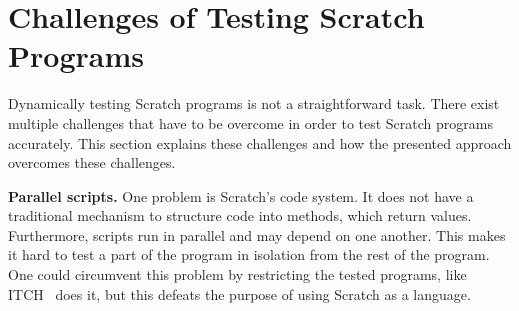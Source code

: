 %
%
%

\section{Challenges of Testing Scratch Programs}


Dynamically testing Scratch programs is not a straightforward task.
There exist multiple challenges that have to be overcome in order to test Scratch programs accurately.
This section explains these challenges and how the presented approach overcomes these challenges.

\textbf{Parallel scripts.}
One problem is Scratch's code system.
It does not have a traditional mechanism to structure code into methods, which return values.
Furthermore, scripts run in parallel and may depend on one another.
This makes it hard to test a part of the program in isolation from the rest of the program.
One could circumvent this problem by restricting the tested programs, like ITCH~\cite{itch} does it,
but this defeats the purpose of using Scratch as a language.

